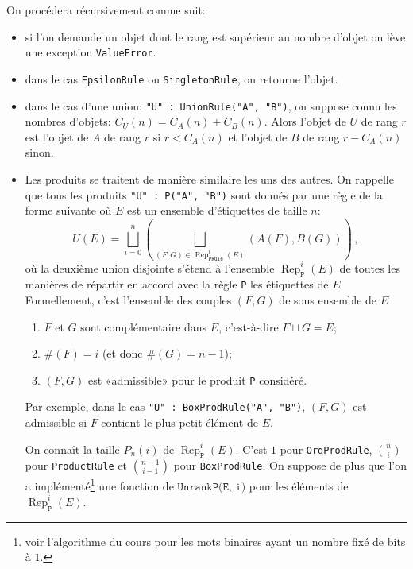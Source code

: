 \documentclass[11pt]{article}
\newcommand{\EpsilonRule}{\texttt{EpsilonRule}\xspace}
\newcommand{\SingletonRule}{\texttt{SingletonRule}\xspace}
\newcommand{\ProductRule}{\texttt{ProductRule}\xspace}
\newcommand{\BoxProdRule}{\texttt{BoxProdRule}\xspace}
\newcommand{\OrdProdRule}{\texttt{OrdProdRule}\xspace}
\begin{document}
\newcommand{\Rep}[2]{\operatorname{Rep}_{\texttt{#1}}^{#2}}
On procédera récursivement comme suit:
\begin{itemize}
\item si l'on demande un objet dont le rang est supérieur au nombre d'objet on
  lève une exception \texttt{ValueError}.
\item dans le cas \EpsilonRule ou \SingletonRule, on retourne
  l'objet.
\item dans le cas d'une union: \texttt{"U" : UnionRule("A", "B")}, on suppose
  connu les nombres d'objets: $C_U(n) = C_A(n) + C_B(n)$. Alors l'objet de $U$
  de rang $r$ est l'objet de $A$ de rang $r$ si $r<C_A(n)$ et l'objet de $B$
  de rang $r-C_A(n)$ sinon.
\item Les produits se traitent de manière similaire les uns des autres. On
  rappelle que tous les produits \texttt{"U" : P("A", "B")} sont donnés
  par une règle de la forme suivante où $E$ est un ensemble d'étiquettes de
  taille $n$:
  \begin{equation}\label{eq.decprod}
  U(E) = \bigsqcup_{i=0}^n\left(
      \bigsqcup_{(F, G) \in\Rep{PRule}{i}(E)} (A(F), B(G))\right)\,,
  \end{equation}
  où la deuxième union disjointe s'étend à l'ensemble $\Rep{P}{i}(E)$ de
  toutes les manières de répartir en accord avec la règle \texttt{P} les
  étiquettes de $E$. Formellement, c'est l'ensemble des couples $(F, G)$ de
  sous ensemble de $E$
  \begin{enumerate}
  \item $F$ et $G$ sont complémentaire dans $E$, c'est-à-dire $F\sqcup G = E$;
  \item $\#(F)=i$ (et donc $\#(G) = n-1$);
  \item $(F,G)$ est «admissible» pour le produit \texttt{P} considéré.
  \end{enumerate}
  Par exemple, dans le cas \texttt{"U" : BoxProdRule("A", "B")}, $(F, G)$ est
  admissible si $F$ contient le plus petit élément de $E$.
  \bigskip

  On connaît la taille $P_n(i)$ de $\Rep{P}{i}(E)$. C'est $1$ pour
  \OrdProdRule, $\binom{n}{i}$ pour \ProductRule et $\binom{n-1}{i-1}$ pour
  \BoxProdRule. On suppose de plus que l'on a implémenté\footnote{voir
    l'algorithme du cours pour les mots binaires ayant un nombre fixé de bits à
    $1$.} une fonction de $\texttt{UnrankP(E, i)}$ pour les éléments de
  $\Rep{P}{i}(E)$.



\end{itemize}
\end{document}
